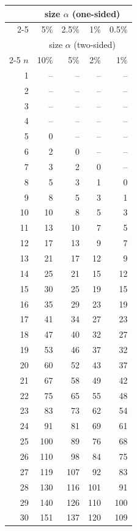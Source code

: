 \noindent
\begin{minipage}[t]{0.32\textwidth}
	\centering
	\begin{tabular}{rrrrr}
		& \multicolumn{4}{c}{size $\alpha$ (one-sided)} \\
		\cline{2-5}
		& 5\% & 2.5\% & 1\% & 0.5\% \\
		& \multicolumn{4}{c}{size $\alpha$ (two-sided)} \\
		\cline{2-5}
		$n$ & 10\% & 5\% & 2\% & 1\% \\
		\midrule
		1 & -- & -- & -- & -- \\
		2 & -- & -- & -- & -- \\
		3 & -- & -- & -- & -- \\
		4 & -- & -- & -- & -- \\
		5 & 0 & -- & -- & -- \\
		6 & 2 & 0 & -- & -- \\
		7 & 3 & 2 & 0 & -- \\
		8 & 5 & 3 & 1 & 0 \\
		9 & 8 & 5 & 3 & 1 \\
		10 & 10 & 8 & 5 & 3 \\[5pt]
		11 & 13 & 10 & 7 & 5 \\
		12 & 17 & 13 & 9 & 7 \\
		13 & 21 & 17 & 12 & 9 \\
		14 & 25 & 21 & 15 & 12 \\
		15 & 30 & 25 & 19 & 15 \\
		16 & 35 & 29 & 23 & 19 \\
		17 & 41 & 34 & 27 & 23 \\
		18 & 47 & 40 & 32 & 27 \\
		19 & 53 & 46 & 37 & 32 \\
		20 & 60 & 52 & 43 & 37 \\[5pt]
		21 & 67 & 58 & 49 & 42 \\
		22 & 75 & 65 & 55 & 48 \\
		23 & 83 & 73 & 62 & 54 \\
		24 & 91 & 81 & 69 & 61 \\
		25 & 100 & 89 & 76 & 68 \\
		26 & 110 & 98 & 84 & 75 \\
		27 & 119 & 107 & 92 & 83 \\
		28 & 130 & 116 & 101 & 91 \\
		29 & 140 & 126 & 110 & 100 \\
		30 & 151 & 137 & 120 & 109 \\
		\midrule
	\end{tabular}
\end{minipage}\hfill
